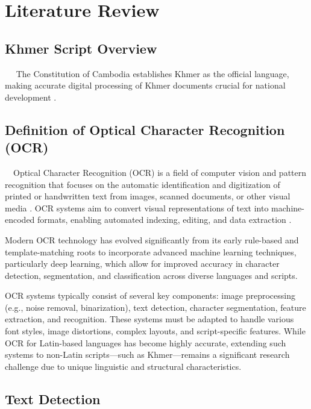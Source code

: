 \chapter{Literature Review}
\label{ch:literature}

\section{Khmer Script Overview}
\label{sec:ocr-overview}
​ ​ ​ ​ The Constitution of Cambodia establishes Khmer as the 
official language, making accurate digital processing of
Khmer documents crucial for national development \citet{Accuracy_Improvement}.



\section{Definition of Optical Character Recognition (OCR)}
\label{sec:ocr-definition}
​ ​ ​ ​ Optical Character Recognition (OCR) is a field of computer vision and pattern recognition
 that focuses on the automatic identification and digitization of printed or handwritten 
 text from images, scanned documents, or other visual media \citep{singh2012survey}. 
 OCR systems aim to convert visual representations of text into machine-encoded formats, 
 enabling automated indexing, editing, and data extraction \citep{muaz2015khmerocr}.

Modern OCR technology has evolved significantly from its early rule-based and template-matching
roots to incorporate advanced machine learning techniques, particularly deep learning,
which allow for improved accuracy in character detection, segmentation, and classification across 
diverse languages and scripts.

OCR systems typically consist of several key components: image preprocessing (e.g., noise removal, binarization), text detection, character segmentation, feature extraction, and recognition. These systems must be adapted to handle various font styles, image distortions, complex layouts, and script-specific features. While OCR for Latin-based languages has become highly accurate, extending such systems to non-Latin scripts—such as Khmer—remains a significant research challenge due to unique linguistic and structural characteristics.
  

\section{Text Detection}
\label{sec:text_detection_literature}

